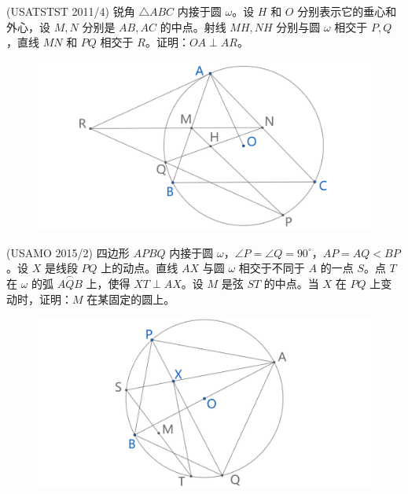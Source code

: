 \newpage 
\begin{exercise}
    (USATSTST 2011/4) 锐角 $\triangle ABC$ 内接于圆 $\omega$。设 $H$ 和 $O$ 分别表示它的垂心和外心，设 $M, N$ 分别是 $AB, AC$ 的中点。射线 $MH, NH$ 分别与圆 $\omega$ 相交于 $P, Q$，直线 $MN$ 和 $PQ$ 相交于 $R$。证明：$OA \perp AR$。
\end{exercise}
\begin{figure}[H]
    \centering
    \includegraphics[width=0.7\linewidth]{figures/exercises/329.png}
\end{figure}

\begin{exercise}
    (USAMO 2015/2) 四边形 $APBQ$ 内接于圆 $\omega$，$\angle P = \angle Q = 90^\circ$，$AP = AQ < BP$。设 $X$ 是线段 ${PQ}$ 上的动点。直线 $AX$ 与圆 $\omega$ 相交于不同于 $A$ 的一点 $S$。点 $T$ 在 $\omega$ 的弧 $\overset{\frown}{AQB}$ 上，使得 $XT \perp AX$。设 $M$ 是弦 ${ST}$ 的中点。当 $X$ 在 ${PQ}$ 上变动时，证明：$M$ 在某固定的圆上。
\end{exercise}
\begin{figure}[H]
    \centering
    \includegraphics[width=0.7\linewidth]{figures/exercises/330.png}
\end{figure}
